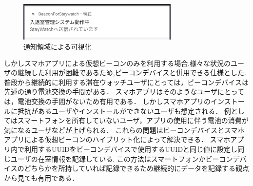 \begin{figure}[tbh]
  \centering
  \includegraphics[width=8cm]{image/notify.jpg}
  \caption{通知領域による可視化}
  \label{multipleBPM}
\end{figure}
 しかしスマホアプリによる仮想ビーコンのみを利用する場合,様々な状況のユーザの継続した利用が困難であるため,ビーコンデバイスと併用できる仕様とした.
 普段から継続的に利用する滞在ウォッチユーザにとっては，ビーコンデバイスは先述の通り電池交換の手間がある．
スマホアプリはそのようなユーザにとっては，電池交換の手間がないため有用である．
 しかしスマホアプリのインストールに抵抗があるユーザやインストールができないユーザも想定される．
例としてはスマートフォンを所有していないユーザ，アプリの使用に伴う電池の消費が気になるユーザなどが上げられる．
 これらの問題はビーコンデバイスとスマホアプリによる仮想ビーコンのハイブリット化によって解決できる．
スマホアプリ内で利用するUUIDをビーコンデバイスで使用するUUIDと同じ値に設定し同じユーザの在室情報を記録している.
この方法はスマートフォンかビーコンデバイスのどちらかを所持していれば記録できるため継続的にデータを記録する観点から見ても有用である．













